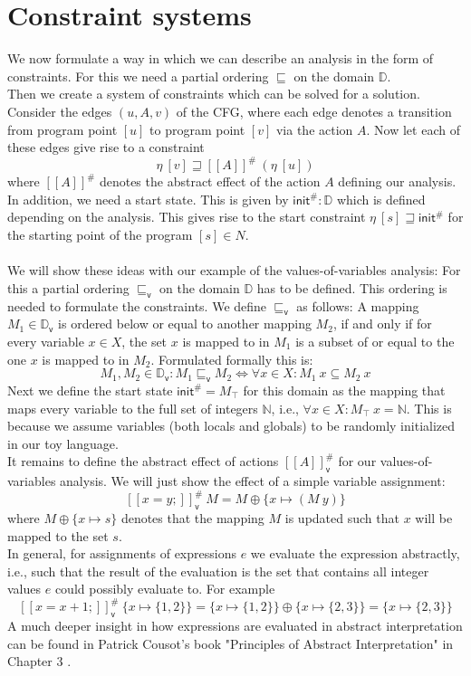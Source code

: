   \section{Constraint systems}
    We now formulate a way in which we can describe an analysis in the form of constraints. For this we need a partial ordering $\sqsubseteq$ on the domain $\mathbb{D}$.\\
    Then we create a system of constraints which can be solved for a solution. Consider the edges $(u, A, v)$ of the CFG, where each edge denotes a transition from program point $[u]$ to program point $[v]$ via the action $A$. Now let each of these edges give rise to a constraint
    \[\eta\ [v] \sqsupseteq [\![A]\!]^{\#}\ (\eta\ [u])\]
    where $[\![A]\!]^{\#}$ denotes the abstract effect of the action $A$ defining our analysis. In addition, we need a start state. This is given by $\textsf{init}^{\#}: \mathbb{D}$ which is defined depending on the analysis. This gives rise to the start constraint $\eta\ [s] \sqsupseteq \textsf{init}^{\#}$ for the starting point of the program $[s] \in N$.\\
    \\
    We will show these ideas with our example of the values-of-variables analysis: For this a partial ordering $\sqsubseteq_\textsf{v}$ on the domain $\mathbb{D}$ has to be defined. This ordering is needed to formulate the constraints. We define $\sqsubseteq_\textsf{v}$ as follows: A mapping $M_1 \in \mathbb{D}_\textsf{v}$ is ordered below or equal to another mapping $M_2$, if and only if for every variable $x \in X$, the set $x$ is mapped to in $M_1$ is a subset of or equal to the one $x$ is mapped to in $M_2$. Formulated formally this is:
    \[M_1, M_2 \in \mathbb{D}_\textsf{v}: M_1 \sqsubseteq_\textsf{v} M_2 \Longleftrightarrow \forall x \in X: M_1\ x \subseteq M_2\ x\]
    Next we define the start state $\textsf{init}^{\#} = M_\top$ for this domain as the mapping that maps every variable to the full set of integers $\mathbb{N}$, i.e., $\forall x \in X: M_\top\ x = \mathbb{N}$. This is because we assume variables (both locals and globals) to be randomly initialized in our toy language.\\
    It remains to define the abstract effect of actions $[\![A]\!]^{\#}_\textsf{v}$ for our values-of-variables analysis. We will just show the effect of a simple variable assignment:
    \[ [\![ x=y; ]\!]^{\#}_\textsf{v}\ M = M \oplus \{x \mapsto (M\ y) \} \]
    where $M \oplus \{x \mapsto s\}$ denotes that the mapping $M$ is updated such that $x$ will be mapped to the set $s$.\\
    In general, for assignments of expressions $e$ we evaluate the expression abstractly, i.e., such that the result of the evaluation is the set that contains all integer values $e$ could possibly evaluate to. For example 
    \[ [\![ x=x+1; ]\!]^{\#}_\textsf{v}\ \{x \mapsto \{1,2\}\} = \{x \mapsto \{1,2\}\} \oplus \{x \mapsto \{2,3\}\} = \{x \mapsto \{2,3\}\}\]
    A much deeper insight in how expressions are evaluated in abstract interpretation can be found in Patrick Cousot's book "Principles of Abstract Interpretation" in Chapter 3 \parencite{cousot2021principles}.

